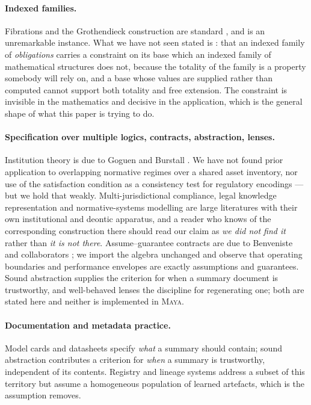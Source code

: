\documentclass[11pt,a4paper]{article}
\renewcommand{\_}{\oldunderscore\allowbreak}
\theoremstyle{plain}
\theoremstyle{definition}
\theoremstyle{definition}
\theoremstyle{remark}
\begin{document}
\paragraph{Indexed families.} Fibrations and the Grothendieck construction are standard
\cite{jacobs1999}, and  is an unremarkable instance. What we have not seen stated
is : that an indexed family of \emph{obligations} carries a constraint on its base
which an indexed family of mathematical structures does not, because the totality of the family is a
property somebody will rely on, and a base whose values are supplied rather than computed cannot support
both totality and free extension. The constraint is invisible in the mathematics and decisive in the
application, which is the general shape of what this paper is trying to do.

\paragraph{Specification over multiple logics, contracts, abstraction, lenses.} Institution theory is due to
Goguen and Burstall \cite{goguen1992,diaconescu2008}. We have not found prior application to overlapping
normative regimes over a shared asset inventory, nor use of the satisfaction condition as a consistency
test for regulatory encodings --- but we hold that weakly. Multi-jurisdictional compliance, legal knowledge
representation and normative-systems modelling are large literatures with their own institutional and
deontic apparatus, and a reader who knows of the corresponding construction there should read our claim as
\emph{we did not find it} rather than \emph{it is not there}. Assume--guarantee contracts are due to Benveniste and
collaborators \cite{benveniste2018,incer2022}; we import the algebra unchanged and observe that operating
boundaries and performance envelopes are exactly assumptions and guarantees. Sound abstraction
\cite{cousot1977} supplies the criterion for when a summary document is trustworthy, and well-behaved lenses
\cite{foster2007} the discipline for regenerating one; both are stated here and neither is implemented
in \textsc{Maya}.

\paragraph{Documentation and metadata practice.} Model cards \cite{mitchell2019} and datasheets
\cite{gebru2021} specify \emph{what} a summary should contain; sound abstraction contributes a criterion for
\emph{when} a summary is trustworthy, independent of its contents. Registry and lineage systems address a
subset of this territory but assume a homogeneous population of learned artefacts, which is the assumption
 removes.
\end{document}
